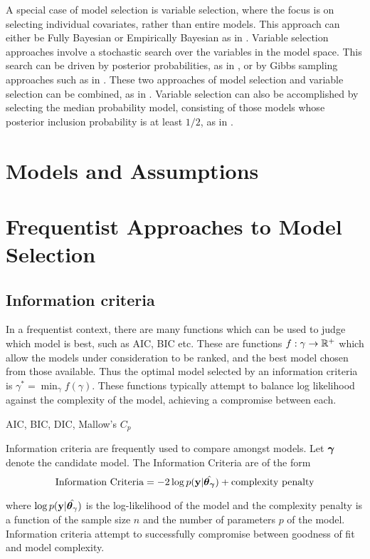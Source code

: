 \documentclass{amsart}[12pt]
\newcommand{\mgc}[1]{{\color{blue}#1}}
\begin{document}
A special case of model selection is variable selection, where the focus is on selecting individual
covariates, rather than entire models. This approach can either be Fully Bayesian or Empirically Bayesian as
in \citep{Cui2008}. Variable selection approaches involve a stochastic search over the variables in the model
space. This search can be driven by posterior probabilities, as in \citep{Casella2006}, or by Gibbs sampling
approaches such as in \citep{George1993}. These two approaches of model selection and variable selection can
be combined, as in \citep{Geweke1996}. Variable selection can also be accomplished by selecting the median
probability model, consisting of those models whose posterior inclusion probability is at least $1/2$, as in
\citep{Barbieri2004}.

\section{Models and Assumptions}

\section{Frequentist Approaches to Model Selection}
\subsection{Information criteria}


In a frequentist context, there are many functions which can be used to judge which model is best,
such as AIC, BIC etc. These are functions $f: \gamma \to {\mathbb{R}}^+$ which allow the models under consideration to
be ranked, and the best model chosen from those available. Thus the optimal model selected by an information
criteria is	$\gamma^* = \min_\gamma f(\gamma)$. These functions typically attempt to balance log likelihood 
against the complexity of the model, achieving a compromise between each.

\mgc{AIC, BIC, DIC, Mallow's $C_p$}

Information criteria are frequently used to compare amongst models. Let ${\boldsymbol \gamma}$ denote the candidate model.
The Information Criteria are of the form
\[
	\text{Information Criteria} = -2 \log p({\bf y} | \hat{{\boldsymbol \theta}_{\boldsymbol \gamma}}) + \text{complexity penalty}
\]

where $\log p({\bf y} | \hat{{\boldsymbol \theta}_\gamma})$ is the log-likelihood of the model and the complexity penalty is
a function of the sample size $n$ and the number of parameters $p$ of the model. Information criteria attempt
to successfully compromise between goodness of fit and model complexity.
\end{document}
